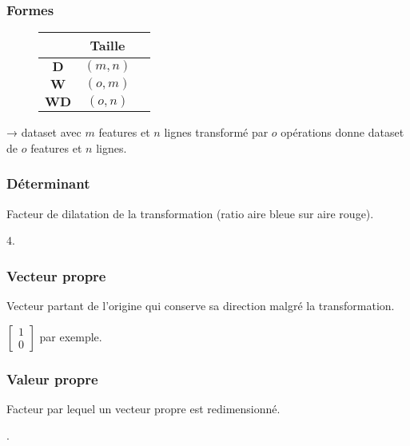 \documentclass{formation}
\begin{document}
\begin{frame}
  \frametitle{Formes}
  \begin{figure}
    \centering
    \begin{tabular}{ccc}
      \toprule
                               & Taille   \\
      \midrule
      $\mathbf{D}$             & $(m, n)$ \\
      $\mathbf{W}$             & $(o, m)$ \\
      $\mathbf{W}\mathbf{D}$ & $(o, n)$ \\
    \end{tabular}
  \end{figure}

  → dataset avec $m$ features et $n$ lignes transformé par $o$
  opérations donne dataset de $o$ features et $n$ lignes.
\end{frame}

\begin{frame}
  \frametitle{Déterminant}


  Facteur de dilatation de la transformation (ratio aire bleue sur
  aire rouge).

  \pause

   \pause $4$.
\end{frame}

\begin{frame}
  \frametitle{Vecteur propre}


  Vecteur partant de l'origine qui conserve sa direction malgré la transformation.

   \pause
  $\begin{bmatrix}1 \\0\end{bmatrix}$ par exemple.
\end{frame}

\begin{frame}
  \frametitle{Valeur propre}


  Facteur par lequel un vecteur propre est redimensionné.

   .
\end{frame}
\end{document}
